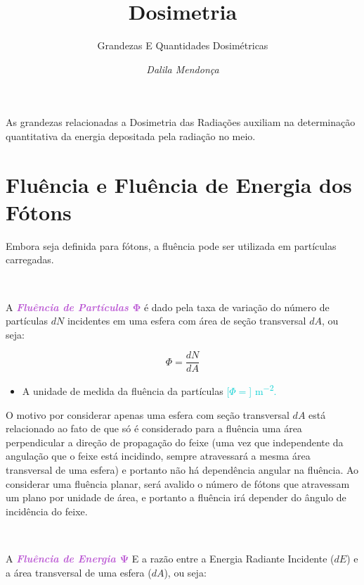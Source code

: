 \documentclass[11pt,a4paper]{article}
\title{\LobsterTwo\Huge{Dosimetria}}
\author{\LobsterTwo\Large{Grandezas E Quantidades Dosimétricas\nocite{*}}}
\date{\LobsterTwo\textit{Dalila Mendonça}}
\newcounter{exemplo}
\begin{document}
	\maketitle

    As grandezas relacionadas a Dosimetria das Radiações auxiliam na determinação quantitativa da energia depositada pela radiação no meio. 
    
    
    \section{Fluência e Fluência de Energia dos Fótons}

        Embora seja definida para fótons, a fluência pode ser utilizada em partículas carregadas. 

        \

        A \textit{\textbf{\textcolor{MediumOrchid}{Fluência de Partículas $\mathbf{\Phi}$}}} é dado pela taxa de variação do número de partículas $dN$ incidentes em uma esfera com área de seção transversal $dA$, ou seja:

			\begin{equation}
			\Phi  = \frac{d N}{d A} 
			\end{equation}
		
		\begin{exemplo}[Unidade]
			\begin{itemize}
				\item A unidade de medida da fluência da partículas	\textcolor{DarkTurquoise}{[$\Phi =$]  \unit{m^{-2}}.}
			\end{itemize}
		\end{exemplo}


    	\noindent  O motivo por considerar apenas uma esfera com seção transversal $dA$ está relacionado ao fato de que só é considerado para a fluência uma área perpendicular a direção de propagação do feixe (uma vez que independente da angulação que o feixe está incidindo, sempre atravessará a mesma área transversal de uma esfera) e portanto não há dependência angular na fluência. Ao considerar uma fluência planar, será avalido o número de fótons que atravessam um plano por unidade de área, e portanto a fluência irá depender do ângulo de incidência do feixe. 

      	\

      	A \textit{\textbf{\textcolor{MediumOrchid}{Fluência de Energia $\mathbf{\Psi}$}}} E a razão entre a Energia Radiante Incidente ($dE$) e a área transversal de uma esfera ($dA$), ou seja:
\end{document}
